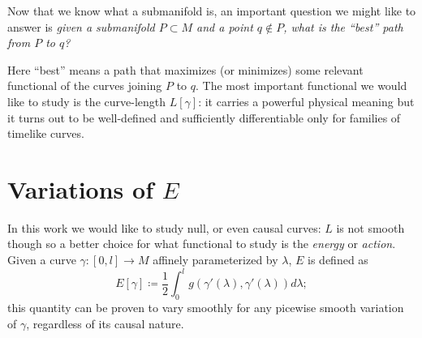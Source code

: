 
Now that we know what a submanifold is, an important question we might like to answer is \emph{given a submanifold \(P\subset M\) and a point \(q \notin P\), what is the ``best'' path from \(P\) to \(q\)?} 

Here ``best'' means a path that maximizes (or minimizes) some relevant functional of the curves joining \(P\) to \(q\). The most important functional we would like to study is the curve-length \(L[\gamma]\): it carries a powerful physical meaning but it turns out to be well-defined and sufficiently differentiable only for families of timelike curves. 


\section{Variations of \(E\)}

In this work we would like to study null, or even causal curves: \(L\) is not smooth though so a better choice for what functional to study is the \emph{energy} or \emph{action}. Given a curve \(\gamma : [0, l] \rightarrow M\) affinely parameterized by \(\lambda\), \(E\) is defined as
\begin{equation*}
E[\gamma] \coloneqq \frac{1}{2}\int_{0}^{l} g(\gamma'(\lambda), \gamma'(\lambda))d\lambda;
\end{equation*}
this quantity can be proven to vary smoothly for any picewise smooth variation of \(\gamma\), regardless of its causal nature.

%

